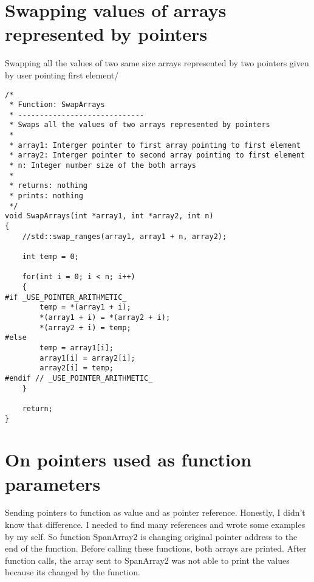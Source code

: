 \documentclass{article}
\begin{document}
\section{Swapping values of arrays represented by pointers}

Swapping all the values of two same size arrays represented by two pointers given by user pointing first element/

\begin{lstlisting}[label=lab3.6,caption=Swapping Two Array]
/*
 * Function: SwapArrays
 * -----------------------------
 * Swaps all the values of two arrays represented by pointers
 *
 * array1: Interger pointer to first array pointing to first element
 * array2: Interger pointer to second array pointing to first element
 * n: Integer number size of the both arrays
 *
 * returns: nothing
 * prints: nothing
 */
void SwapArrays(int *array1, int *array2, int n)
{
    //std::swap_ranges(array1, array1 + n, array2);

    int temp = 0;

    for(int i = 0; i < n; i++)
    {
#if _USE_POINTER_ARITHMETIC_
        temp = *(array1 + i);
        *(array1 + i) = *(array2 + i);
        *(array2 + i) = temp;
#else
        temp = array1[i];
        array1[i] = array2[i];
        array2[i] = temp;
#endif // _USE_POINTER_ARITHMETIC_
    }

    return;
}
\end{lstlisting}	



\section{On pointers used as function parameters}

Sending pointers to function as value and as pointer reference. Honestly, I didn't know that difference. I needed to find many references and wrote some examples by my self. So function SpanArray2 is changing original pointer address to the end of the function. Before calling these functions, both arrays are printed. After function calls, the array sent to SpanArray2 was not able to print the values because its changed by the function.
\end{document}
